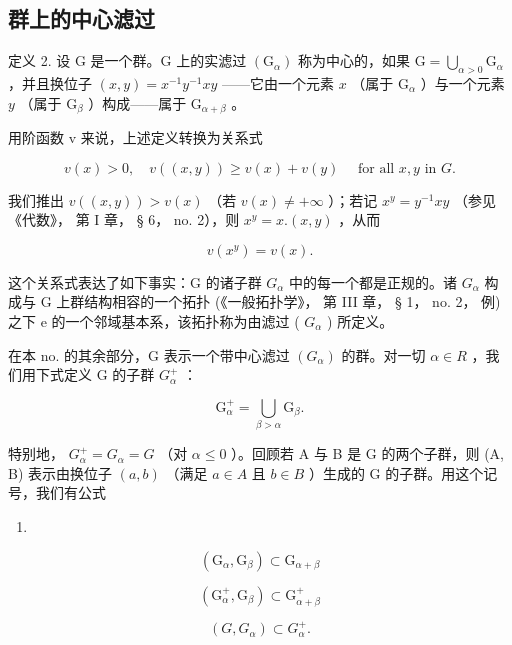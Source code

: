 \subsection{群上的中心滤过}

定义 2. 设 G 是一个群。G 上的实滤过 \((\mathrm{G}_{\alpha})\) 称为中心的，如果 \(\mathrm{G} = \bigcup_{\alpha >0}\mathrm{G}_{\alpha}\) ，并且换位子 \((x,y) = x^{-1}y^{-1}xy\) ——它由一个元素 \(x\) （属于 \(\mathrm{G}_{\alpha}\) ）与一个元素 \(y\) （属于 \(\mathrm{G}_{\beta}\) ）构成——属于 \(\mathrm{G}_{\alpha +\beta}\) 。

用阶函数 v 来说，上述定义转换为关系式

\[
v (x) > 0, \quad v ((x, y)) \geqslant v (x) + v (y) \quad \text { for   all } x, y \text { in } G.\tag{10}
\]

我们推出 \(v((x,y)) > v(x)\) （若 \(v(x) \neq +\infty\) ）；若记 \(x^y = y^{-1}xy\) （参见《代数》， 第 I 章， § 6， no. 2），则 \(x^y = x.(x,y)\) ，从而

\[
v (x ^ {y}) = v (x).\tag{11}
\]

这个关系式表达了如下事实：G 的诸子群 \(G_{\alpha}\) 中的每一个都是正规的。诸 \(G_{\alpha}\) 构成与 G 上群结构相容的一个拓扑 (《一般拓扑学》， 第 III 章， § 1， no. 2， 例) 之下 e 的一个邻域基本系，该拓扑称为由滤过 ( \(G_{\alpha}\) ) 所定义。

在本 no. 的其余部分，G 表示一个带中心滤过 \((G_{\alpha})\) 的群。对一切 \(\alpha \in R\) ，我们用下式定义 G 的子群 \(G_{\alpha}^{+}\) ：

\[
\mathrm{G} _ {\alpha} ^ {+} = \bigcup_ {\beta > \alpha} \mathrm{G} _ {\beta}.\tag{12}
\]

特别地， \(G_{\alpha}^{+} = G_{\alpha} = G\) （对 \(\alpha \leqslant 0\) ）。回顾若 A 与 B 是 G 的两个子群，则 (A, B) 表示由换位子 \((a, b)\) （满足 \(a \in A\) 且 \(b \in B\) ）生成的 G 的子群。用这个记号，我们有公式

\begin{enumerate}
\def\labelenumi{(\arabic{enumi})}
\setcounter{enumi}{12}
\tightlist
\item
\end{enumerate}

\[
\left(\mathrm{G} _ {\alpha}, \mathrm{G} _ {\beta}\right) \subset \mathrm{G} _ {\alpha + \beta}\tag{13}
\]

\[
\left(\mathrm{G} _ {\alpha} ^ {+}, \mathrm{G} _ {\beta}\right) \subset \mathrm{G} _ {\alpha + \beta} ^ {+}\tag{13'}
\]

\[
(G, G _ {\alpha}) \subset G _ {\alpha} ^ {+}.\tag{14}
\]

